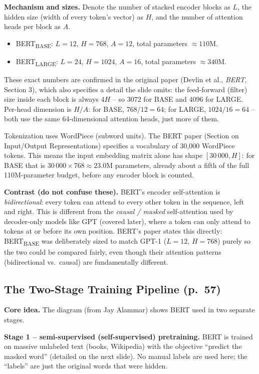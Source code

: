 \documentclass[11pt]{article}
\begin{document}
\textbf{Mechanism and sizes.} Denote the number of stacked encoder blocks as $L$, the hidden size (width of every token's vector) as $H$, and the number of attention heads per block as $A$.
\begin{itemize}
\item BERT\textsubscript{BASE}: $L=12$, $H=768$, $A=12$, total parameters $\approx 110$M.
\item BERT\textsubscript{LARGE}: $L=24$, $H=1024$, $A=16$, total parameters $\approx 340$M.
\end{itemize}
These exact numbers are confirmed in the original paper (Devlin et al., \emph{BERT}, Section 3), which also specifies a detail the slide omits: the feed-forward (filter) size inside each block is always $4H$ -- so $3072$ for BASE and $4096$ for LARGE. Per-head dimension is $H/A$: for BASE, $768/12=64$; for LARGE, $1024/16=64$ -- both use the same 64-dimensional attention heads, just more of them.

Tokenization uses WordPiece (subword units). The BERT paper (Section on Input/Output Representations) specifies a vocabulary of 30{,}000 WordPiece tokens. This means the input embedding matrix alone has shape $[30\,000, H]$: for BASE that is $30\,000 \times 768 \approx 23.0$M parameters, already about a fifth of the full 110M-parameter budget, before any encoder block is counted.

\textbf{Contrast (do not confuse these).} BERT's encoder self-attention is \emph{bidirectional}: every token can attend to every other token in the sequence, left and right. This is different from the \emph{causal / masked} self-attention used by decoder-only models like GPT (covered later), where a token can only attend to tokens at or before its own position. BERT's paper states this directly: BERT\textsubscript{BASE} was deliberately sized to match GPT-1 ($L=12$, $H=768$) purely so the two could be compared fairly, even though their attention patterns (bidirectional vs.\ causal) are fundamentally different.

\subsection{The Two-Stage Training Pipeline (p.\ 57)}

\textbf{Core idea.} The diagram (from Jay Alammar) shows BERT used in two separate stages.

\textbf{Stage 1 -- semi-supervised (self-supervised) pretraining.} BERT is trained on massive unlabeled text (books, Wikipedia) with the objective ``predict the masked word'' (detailed on the next slide). No manual labels are used here; the ``labels'' are just the original words that were hidden.
\end{document}
